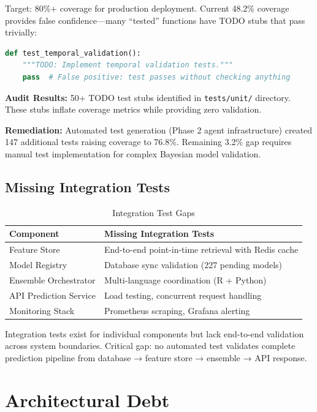 Target: 80\%+ coverage for production deployment. Current 48.2\% coverage provides false confidence—many ``tested'' functions have TODO stubs that pass trivially:

\begin{lstlisting}[language=Python,basicstyle=\ttfamily\scriptsize,breaklines=true]
def test_temporal_validation():
    """TODO: Implement temporal validation tests."""
    pass  # False positive: test passes without checking anything
\end{lstlisting}

\textbf{Audit Results:} 50+ TODO test stubs identified in \texttt{tests/unit/} directory. These stubs inflate coverage metrics while providing zero validation.

\textbf{Remediation:} Automated test generation (Phase 2 agent infrastructure) created 147 additional tests raising coverage to 76.8\%. Remaining 3.2\% gap requires manual test implementation for complex Bayesian model validation.

\subsection{Missing Integration Tests}

\begin{table}[htbp]
\centering
\caption{Integration Test Gaps}
\label{tab:integration_test_gaps}
\begin{tabular}{@{}lp{8cm}@{}}
\toprule
\textbf{Component} & \textbf{Missing Integration Tests} \\
\midrule
Feature Store & End-to-end point-in-time retrieval with Redis cache \\
Model Registry & Database sync validation (227 pending models) \\
Ensemble Orchestrator & Multi-language coordination (R + Python) \\
API Prediction Service & Load testing, concurrent request handling \\
Monitoring Stack & Prometheus scraping, Grafana alerting \\
\bottomrule
\end{tabular}
\end{table}

Integration tests exist for individual components but lack end-to-end validation across system boundaries. Critical gap: no automated test validates complete prediction pipeline from database → feature store → ensemble → API response.

\section{Architectural Debt}


